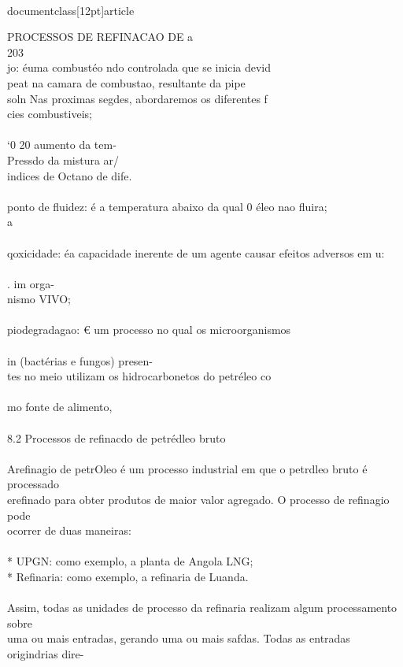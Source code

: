 \\documentclass[12pt]{article}
\begin{document}
PROCESSOS DE REFINACAO DE a\\
203\\
jo: éuma combustéo ndo controlada que se inicia devid\\
peat na camara de combustao, resultante da pipe\\
soln Nas proximas segdes, abordaremos os diferentes f\\
cies combustiveis;\\
\\
‘0 20 aumento da tem-\\
Pressdo da mistura ar/\\
indices de Octano de dife.\\
\\
ponto de fluidez: é a temperatura abaixo da qual 0 éleo nao fluira;\\
a\\
\\
qoxicidade: éa capacidade inerente de um agente causar efeitos adversos em u:\\
\\
. im orga-\\
nismo VIVO;\\
\\
piodegradagao: € um processo no qual os microorganismos\\
\\
in (bactérias e fungos) presen-\\
tes no meio utilizam os hidrocarbonetos do petréleo co\\
\\
mo fonte de alimento,\\
\\
8.2 Processos de refinacdo de petrédleo bruto\\
\\
Arefinagio de petrOleo é um processo industrial em que o petrdleo bruto é processado\\
erefinado para obter produtos de maior valor agregado. O processo de refinagio pode\\
ocorrer de duas maneiras:\\
\\
* UPGN: como exemplo, a planta de Angola LNG;\\
* Refinaria: como exemplo, a refinaria de Luanda.\\
\\
Assim, todas as unidades de processo da refinaria realizam algum processamento sobre\\
uma ou mais entradas, gerando uma ou mais safdas. Todas as entradas origindrias dire-\\
\end{document}
